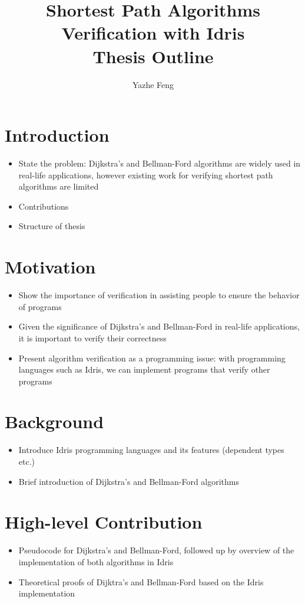 \documentclass[12pt, oneside]{article}
\title{\Large{\textbf{Shortest Path Algorithms Verification with Idris}} \\ \textbf{\large{Thesis Outline}}}
\author{Yazhe Feng}
\begin{document}
\maketitle
\section{Introduction}
\begin{itemize}
	\item State the problem: Dijkstra's and Bellman-Ford algorithms are widely used in real-life applications, however existing work for verifying shortest path algorithms are limited
	\item Contributions
	\item Structure of thesis
\end{itemize}

\section{Motivation}
\begin{itemize}
	\item Show the importance of verification in assisting people to ensure the behavior of programs
	\item Given the significance of Dijkstra's and Bellman-Ford in real-life applications, it is important to verify their correctness
	\item Present algorithm verification as a programming issue: with programming languages such as Idris, we can implement programs that verify other programs
\end{itemize}

\section{Background}
\begin{itemize}
	\item Introduce Idris programming languages and its features (dependent types etc.)
	\item Brief introduction of Dijkstra's and Bellman-Ford algorithms
\end{itemize}

\section{High-level Contribution}
\begin{itemize}
	\item Pseudocode for Dijkstra's and Bellman-Ford, followed up by overview of the implementation of both algorithms in Idris 
	\item Theoretical proofs of Dijktra's and Bellman-Ford based on the Idris implementation 
\end{itemize}
\end{document}
